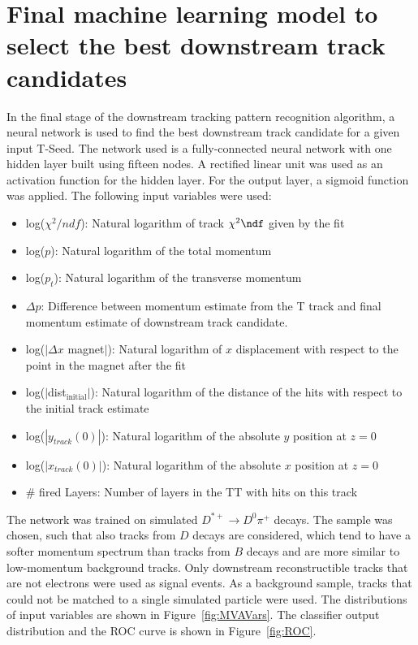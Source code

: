 \section{Final machine learning model to select the best downstream track candidates}

In the final stage of the downstream tracking pattern recognition algorithm, a neural network is used to find the best downstream track candidate for a given input T-Seed.
 The network used is a fully-connected neural network with one hidden layer built using fifteen nodes. 
A rectified linear unit was used as an activation function for the hidden layer. For the output layer, a sigmoid function was applied. The following input variables were used:

\begin{itemize}
\item log($\chi^{2}/ndf$): Natural logarithm of track $\chi^{2}\ndf$
given by the fit
\item log($p$): Natural logarithm of the total momentum
\item log($p_t$): Natural logarithm of the transverse momentum
\item $\Delta p$: Difference between momentum estimate from the T track and final momentum estimate of downstream track candidate.
\item log($|\Delta x$ magnet$|$): Natural logarithm of $x$ displacement with respect to
the point in the magnet after the fit
\item log($|$dist$_{\text{initial}}|$): Natural logarithm of the distance of the hits with respect 
to the initial track estimate
\item log($|y_{track}(0)|$): Natural logarithm of the absolute $y$ position at
$z=0$
\item log($|x_{track}(0)|$): Natural logarithm of the absolute $x$ position at
$z=0$
\item \# fired Layers: Number of layers in the TT with hits on this track
\end{itemize}

The network was trained on simulated $D^{*+} \rightarrow D^{0}\pi^{+}$ decays. The sample was chosen, such that also tracks from $D$ decays are considered, which tend to have a softer momentum spectrum than tracks from $B$ 
decays and are more similar to low-momentum background tracks. Only downstream reconstructible tracks 
that are not electrons were used as signal events. As a background sample, 
tracks that could not be matched to a single
simulated particle were used. The distributions of input variables are shown in Figure~\ref{fig:MVAVars}. The classifier output distribution and the ROC curve is shown in Figure~\ref{fig:ROC}. 

